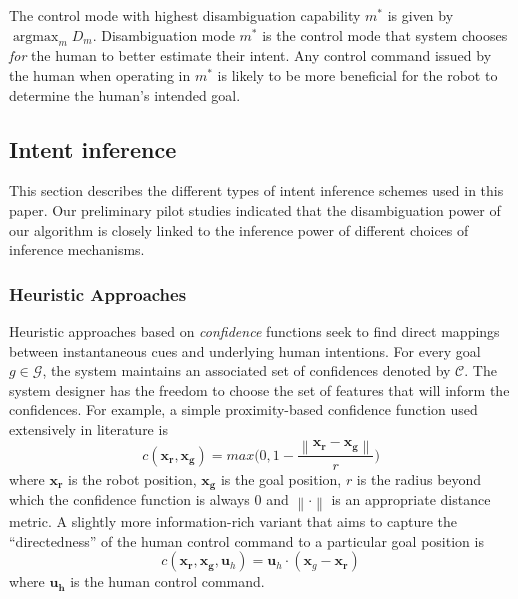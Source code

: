 \documentclass[conference]{IEEEtran}
\DeclareMathOperator*{\argmax}{argmax}
\newcommand{\norm}[1]{\left\lVert#1\right\rVert}
\begin{document}
The control mode with highest disambiguation capability $m^*$ is given by $\argmax_m D_m$. Disambiguation mode $m^*$ is the control mode that system chooses \textit{for} the human to better estimate their intent. Any control command issued by the human when operating in $m^*$ is likely to be more beneficial for the robot to determine the human's intended goal. 

\subsection{Intent inference}\label{ssec:inference}
This section describes the different types of intent inference schemes used in this paper. Our preliminary pilot studies indicated that the disambiguation power of our algorithm is closely linked to the inference power of different choices of inference mechanisms. 

\subsubsection{Heuristic Approaches}
Heuristic approaches based on \textit{confidence} functions seek to find direct mappings between instantaneous cues and underlying human intentions. For every goal $g \in \mathcal{G}$, the system maintains an associated set of confidences denoted by $\mathcal{C}$. The system designer has the freedom to choose the set of features that will inform the confidences. For example, a simple proximity-based confidence function used extensively in literature is
\begin{equation}
c(\boldsymbol{x_r}, \boldsymbol{x_g}) = max\Big(0, 1 - \frac{\norm{\boldsymbol{x_r} - \boldsymbol{x_g}}}{r}\Big)
\end{equation}
where $\boldsymbol{x_r}$ is the robot position, $\boldsymbol{x_g}$ is the goal position, $r$ is the radius beyond which the confidence function is always 0 and $\norm{\cdot}$ is an appropriate distance metric. 
A slightly more information-rich variant that aims to capture the ``directedness'' of the human control command to a particular goal position is
\begin{equation*}
c({\boldsymbol{x_r},\boldsymbol{x_g}, \boldsymbol{u}_{h}}) = \boldsymbol{u}_h\cdot(\boldsymbol{x}_{g} - \boldsymbol{x_r})
\end{equation*}
where $\boldsymbol{u_h}$ is the human control command. 
\end{document}
